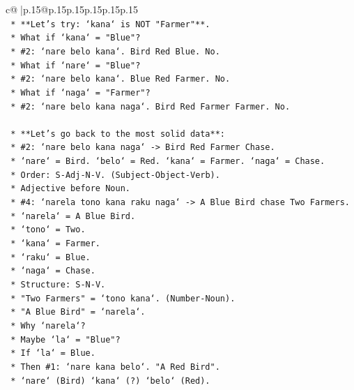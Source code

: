 \documentclass{article}
\begin{document}
{\begin{supertabular}{c@{$\;$}|p{.15\linewidth}@{}p{.15\linewidth}p{.15\linewidth}p{.15\linewidth}p{.15\linewidth}p{.15\linewidth}}
{{{\\ 
\texttt{    *   **Let's try: `kana` is NOT "Farmer"**.} \\
\texttt{        *   What if `kana` = "Blue"?} \\
\texttt{            *   \#2: `nare belo kana`. Bird Red Blue. No.} \\
\texttt{        *   What if `nare` = "Blue"?} \\
\texttt{            *   \#2: `nare belo kana`. Blue Red Farmer. No.} \\
\texttt{        *   What if `naga` = "Farmer"?} \\
\texttt{            *   \#2: `nare belo kana naga`. Bird Red Farmer Farmer. No.} \\
\\ 
\texttt{    *   **Let's go back to the most solid data**:} \\
\texttt{        *   \#2: `nare belo kana naga` {-}> Bird Red Farmer Chase.} \\
\texttt{            *   `nare` = Bird. `belo` = Red. `kana` = Farmer. `naga` = Chase.} \\
\texttt{            *   Order: S{-}Adj{-}N{-}V. (Subject{-}Object{-}Verb).} \\
\texttt{            *   Adjective before Noun.} \\
\texttt{        *   \#4: `narela tono kana raku naga` {-}> A Blue Bird chase Two Farmers.} \\
\texttt{            *   `narela` = A Blue Bird.} \\
\texttt{            *   `tono` = Two.} \\
\texttt{            *   `kana` = Farmer.} \\
\texttt{            *   `raku` = Blue.} \\
\texttt{            *   `naga` = Chase.} \\
\texttt{            *   Structure: S{-}N{-}V.} \\
\texttt{            *   "Two Farmers" = `tono kana`. (Number{-}Noun).} \\
\texttt{            *   "A Blue Bird" = `narela`.} \\
\texttt{            *   Why `narela`?} \\
\texttt{            *   Maybe `la` = "Blue"?} \\
\texttt{            *   If `la` = Blue.} \\
\texttt{            *   Then \#1: `nare kana belo`. "A Red Bird".} \\
\texttt{                *   `nare` (Bird) `kana` (?) `belo` (Red).} \\
}}}
\end{supertabular}}
\end{document}
